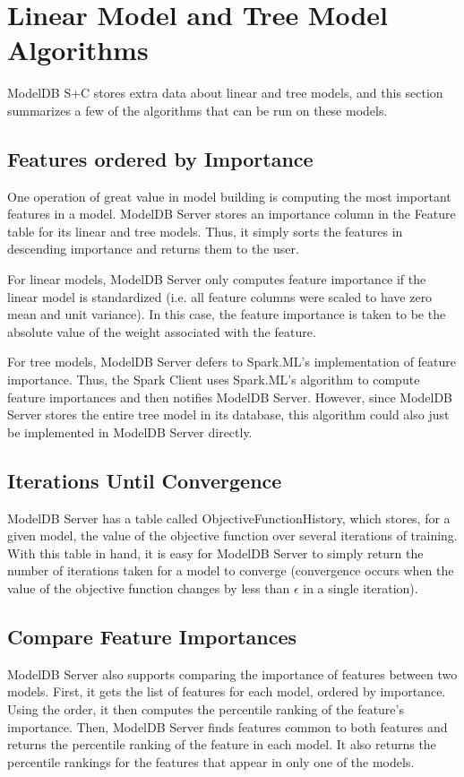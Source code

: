 \section{Linear Model and Tree Model Algorithms}
ModelDB S+C stores extra data about linear and tree models, and this section 
summarizes a few of the algorithms that can be run on these models.

\subsection{Features ordered by Importance}
One operation of great value in model building is computing the most important
features in a model. ModelDB Server stores an importance column in the Feature
table for its linear and tree models. Thus, it simply sorts the features in
descending importance and returns them to the user.

For linear models, ModelDB Server only computes feature importance if the linear model
is standardized (i.e. all feature columns were scaled to have zero mean and unit variance).
In this case, the feature importance is taken to be the absolute value of the weight 
associated with the feature.

For tree models, ModelDB Server defers to Spark.ML's implementation of feature importance. Thus,
the Spark Client uses Spark.ML's algorithm to compute feature importances and then notifies 
ModelDB Server. However, since ModelDB Server stores the entire tree model in its database, this algorithm
could also just be implemented in ModelDB Server directly.

\subsection{Iterations Until Convergence}
ModelDB Server has a table called ObjectiveFunctionHistory, which stores, for a given model,
the value of the objective function over several iterations of training. With this table in hand,
it is easy for ModelDB Server to simply return the number of iterations taken for a model to converge
(convergence occurs when the value of the objective function changes by less than $\epsilon$ in a single
iteration).

\subsection{Compare Feature Importances}
ModelDB Server also supports comparing the importance of features between two models. First, it gets
the list of features for each model, ordered by importance. Using the order, it then computes the
percentile ranking of the feature's importance. Then, ModelDB Server finds features common to both features
and returns the percentile ranking of the feature in each model. It also returns the percentile rankings for
the features that appear in only one of the models.

